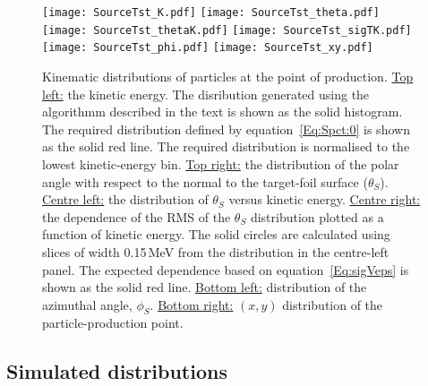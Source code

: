 \begin{figure}
  \begin{center}
    \texttt{[image: SourceTst\_K.pdf]}
    \texttt{[image: SourceTst\_theta.pdf]}
    \texttt{[image: SourceTst\_thetaK.pdf]}
    \texttt{[image: SourceTst\_sigTK.pdf]}
    \texttt{[image: SourceTst\_phi.pdf]}
    \texttt{[image: SourceTst\_xy.pdf]}
  \end{center}
  \caption{Kinematic distributions of particles at the point of
    production.
    \underline{Top left:} the kinetic energy.
    The disribution generated using the algorithmm described in the
    text is shown as the solid histogram.
    The required distribution defined by equation~\ref{Eq:Spct:0} is
    shown as the solid red line.
    The required distribution is normalised to the lowest
    kinetic-energy bin.
    \underline{Top right:} the distribution of the polar angle with
    respect to the normal to the target-foil surface ($\theta_S$).
    \underline{Centre left:} the distribution of $\theta_S$ versus
    kinetic energy.
    \underline{Centre right:} the dependence of the RMS of the
    $\theta_S$ distribution plotted as a function of kinetic energy.
    The solid circles are calculated using slices of width 0.15\,MeV
    from the distribution in the centre-left panel.
    The expected dependence based on equation~\ref{Eq:sigVeps} is
    shown as the solid red line.
    \underline{Bottom left:} distribution of the azimuthal angle,
    $\phi_S$. 
    \underline{Bottom right:} $(x, y)$ distribution of the
    particle-production point.
  }
  \label{Fig:LsrDrvSrc:Dists}
\end{figure}

\subsection{Simulated distributions}

